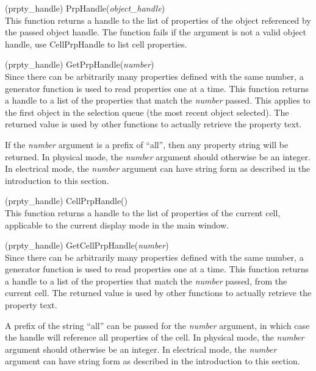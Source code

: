 \begin{description}
\item{(prpty\_handle) \vt PrpHandle({\it object\_handle})}\\
This function returns a handle to the list of properties of the object
referenced by the passed object handle.  The function fails if the
argument is not a valid object handle, use {\vt CellPrpHandle} to list
cell properties.

\item{(prpty\_handle) \vt GetPrpHandle({\it number\/})}\\
Since there can be arbitrarily many properties defined with the same
number, a generator function is used to read properties one at a time. 
This function returns a handle to a list of the properties that match
the {\it number} passed.  This applies to the first object in the
selection queue (the most recent object selected).  The returned value
is used by other functions to actually retrieve the property text.

If the {\it number} argument is a prefix of ``{\vt all}'', then any
property string will be returned.  In physical mode, the {\it number}
argument should otherwise be an integer.  In electrical mode, the {\it
number} argument can have string form as described in the introduction
to this section.

\item{(prpty\_handle) \vt CellPrpHandle()}\\
This function returns a handle to the list of properties of the
current cell, applicable to the current display mode in the main
window.

\item{(prpty\_handle) \vt GetCellPrpHandle({\it number\/})}\\
Since there can be arbitrarily many properties defined with the same
number, a generator function is used to read properties one at a time. 
This function returns a handle to a list of the properties that match
the {\it number} passed, from the current cell.  The returned value is
used by other functions to actually retrieve the property text.

A prefix of the string ``{\vt all}'' can be passed for the {\it
number} argument, in which case the handle will reference all
properties of the cell.  In physical mode, the {\it number} argument
should otherwise be an integer.  In electrical mode, the {\it number}
argument can have string form as described in the introduction to this
section.


\end{description}
